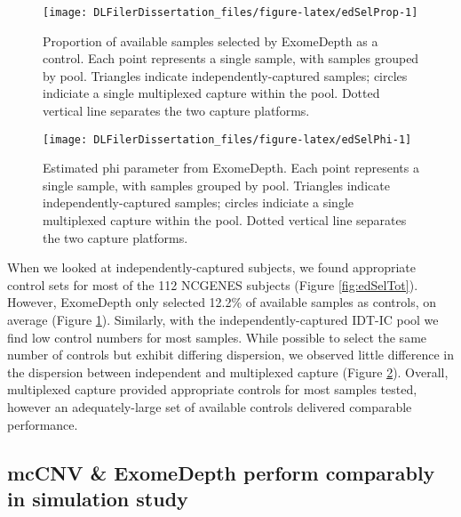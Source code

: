 \documentclass[11pt,letterpaper]{book}
\begin{document}
\begin{figure}

{\centering \texttt{[image: DLFilerDissertation\_files/figure-latex/edSelProp-1]} 

}

\caption[Proportion of available samples selected by ExomeDepth as a control.]{Proportion of available samples selected by ExomeDepth as a control. Each point represents a single sample, with samples grouped by pool. Triangles indicate independently-captured samples; circles indiciate a single multiplexed capture within the pool. Dotted vertical line separates the two capture platforms.}\label{fig:edSelProp}
\end{figure}



\begin{figure}

{\centering \texttt{[image: DLFilerDissertation\_files/figure-latex/edSelPhi-1]} 

}

\caption[Estimated phi parameter from ExomeDepth.]{Estimated phi parameter from ExomeDepth. Each point represents a single sample, with samples grouped by pool. Triangles indicate independently-captured samples; circles indiciate a single multiplexed capture within the pool. Dotted vertical line separates the two capture platforms.}\label{fig:edSelPhi}
\end{figure}

When we looked at independently-captured subjects, we found appropriate control sets for most of the 112 NCGENES subjects (Figure \ref{fig:edSelTot}).
However, ExomeDepth only selected 12.2\% of available samples as controls, on average (Figure \ref{fig:edSelProp}).
Similarly, with the independently-captured IDT-IC pool we find low control numbers for most samples.
While possible to select the same number of controls but exhibit differing dispersion, we observed little difference in the dispersion between independent and multiplexed capture (Figure \ref{fig:edSelPhi}).
Overall, multiplexed capture provided appropriate controls for most samples tested, however an adequately-large set of available controls delivered comparable performance.

\hypertarget{mccnv-exomedepth-perform-comparably-in-simulation-study}{%
\subsection{mcCNV \& ExomeDepth perform comparably in simulation study}\label{mccnv-exomedepth-perform-comparably-in-simulation-study}}
\end{document}
